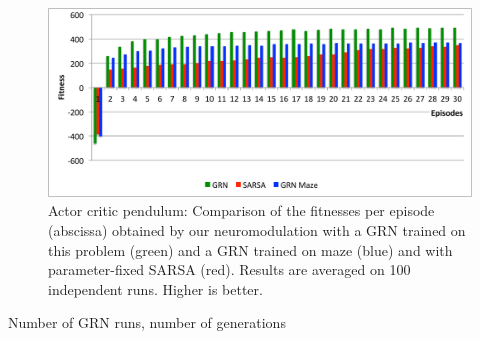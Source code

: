 \begin{figure}[h]
\includegraphics[width=\linewidth]{ACP_GRNvsSARSA.pdf}
\caption{Actor critic pendulum: Comparison of the fitnesses per episode (abscissa) obtained by our neuromodulation with a GRN trained on this problem (green) and a GRN trained on maze (blue) and with parameter-fixed SARSA (red). Results are averaged on 100 independent runs. Higher is better.}\label{fig:ACP:GRNvsSARSA}
\end{figure}

Number of GRN runs, number of generations

